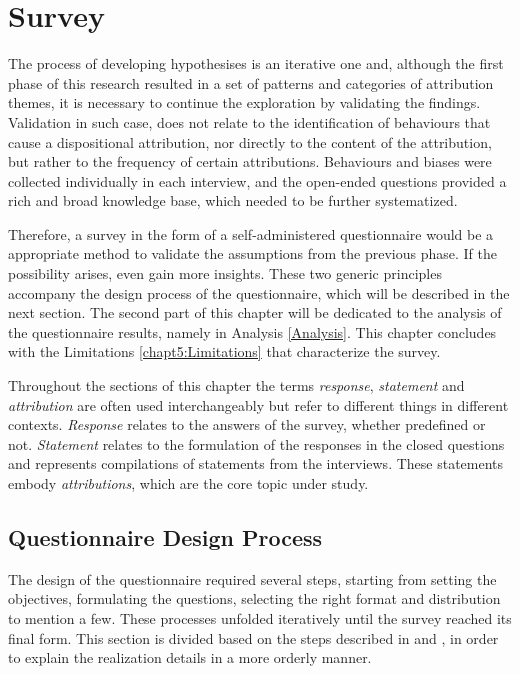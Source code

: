 \chapter{Survey} \label{chap:Survey}

The process of developing hypothesises is an iterative one and, although the first phase of this research resulted in a set of patterns and categories of attribution themes, it is necessary to continue the exploration by validating the findings. Validation in such case, does not relate to the identification of behaviours that cause a dispositional attribution, nor directly to the content of the attribution, but rather to the frequency of certain attributions. Behaviours and biases were collected individually in each interview, and the open-ended questions provided a rich and broad knowledge base, which needed to be further systematized. 

Therefore, a survey in the form of a self-administered questionnaire would be a appropriate method to validate the assumptions from the previous phase. If the possibility arises, even gain more insights. These two generic principles accompany the design process of the questionnaire, which will be described in the next section. The second part of this chapter will be dedicated to the analysis of the questionnaire results, namely in Analysis \ref{Analysis}. This chapter concludes with the Limitations \ref{chapt5:Limitations} that characterize the survey.

Throughout the sections of this chapter the terms \textit{response}, \textit{statement} and \textit{attribution} are often used interchangeably but refer to different things in different contexts. \textit{Response} relates to the answers of the survey, whether predefined or not. \textit{Statement} relates to the formulation of the responses in the closed questions and represents compilations of statements from the interviews. These statements embody \textit{attributions}, which are the core topic under study.

\section{Questionnaire Design Process} \label{questionnaireDesignProcess}

The design of the questionnaire required several steps, starting from setting the objectives, formulating the questions, selecting the right format and distribution to mention a few. These processes unfolded iteratively until the survey reached its final form. This section is divided based on the steps described in \cite{Scheuren2004} and \cite{Fink2003}, in order to explain the realization details in a more orderly manner.

